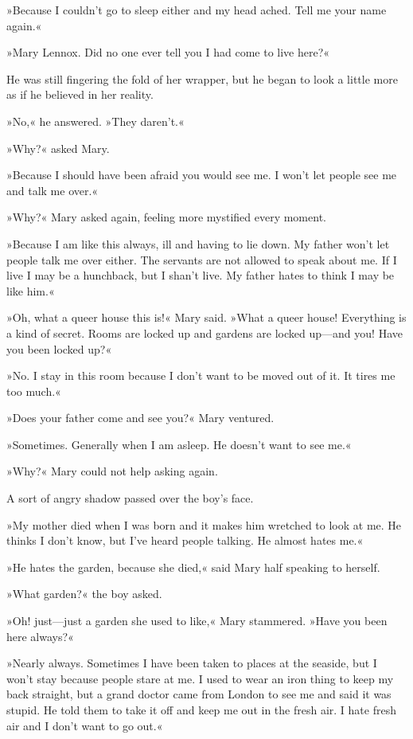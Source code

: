 »Because I couldn't go to sleep either and my head ached. Tell me your name again.«

»Mary Lennox. Did no one ever tell you I had come to live here?«

He was still fingering the fold of her wrapper, but he began to look a little more as if he believed in her reality.

»No,« he answered. »They daren't.«

»Why?« asked Mary.

»Because I should have been afraid you would see me. I won't let people see me and talk me over.«

»Why?« Mary asked again, feeling more mystified every moment.

»Because I am like this always, ill and having to lie down. My father won't let people talk me over either. The servants are not allowed to speak about me. If I live I may be a hunchback, but I shan't live. My father hates to think I may be like him.«

»Oh, what a queer house this is!« Mary said. »What a queer house! Everything is a kind of secret. Rooms are locked up and gardens are locked up—and you! Have you been locked up?«

»No. I stay in this room because I don't want to be moved out of it. It tires me too much.«

»Does your father come and see you?« Mary ventured.

»Sometimes. Generally when I am asleep. He doesn't want to see me.«

»Why?« Mary could not help asking again.

A sort of angry shadow passed over the boy's face.

»My mother died when I was born and it makes him wretched to look at me. He thinks I don't know, but I've heard people talking. He almost hates me.«

»He hates the garden, because she died,« said Mary half speaking to herself.

»What garden?« the boy asked.

»Oh! just—just a garden she used to like,« Mary stammered. »Have you been here always?«

»Nearly always. Sometimes I have been taken to places at the seaside, but I won't stay because people stare at me. I used to wear an iron thing to keep my back straight, but a grand doctor came from London to see me and said it was stupid. He told them to take it off and keep me out in the fresh air. I hate fresh air and I don't want to go out.«

